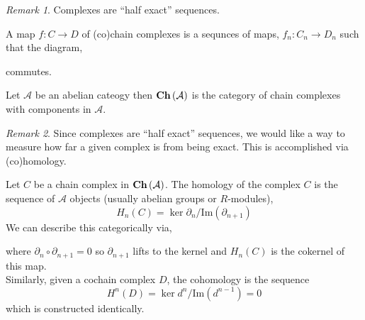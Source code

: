 \documentclass[12pt]{article}
\renewcommand{\Im}[1]{\mathrm{Im}(#1)}
\newcommand{\A}{\mathcal{A}}
\theoremstyle{remark}
\newtheorem*{remark}{Remark}
\theoremstyle{definition}
\newenvironment{definition}[1][Definition:]{\begin{trivlist}
\item[\hskip \labelsep {\bfseries #1}]}{\end{trivlist}}
\begin{document}
\begin{remark}
Complexes are ``half exact'' sequences. 
\end{remark}

\begin{definition}
A map $f : C \to D$ of (co)chain complexes is a sequnces of maps, $f_n : C_n \to D_n$ such that the diagram,
\begin{center}
\end{center}
commutes.
\end{definition}

\begin{definition}
Let $\A$ be an abelian cateogy then $\Ch{\A}$ is the category of chain complexes with components in $\A$. 
\end{definition}

\begin{remark}
Since complexes are ``half exact'' sequences, we would like a way to measure how far a given complex is from being exact. This is accomplished via (co)homology. 
\end{remark}

\begin{definition}
Let $C$ be a chain complex in $\Ch{\A}$. The homology of the complex $C$ is the sequence of $\A$ objects (usually abelian groups or $R$-modules),
\[ H_n(C) = \ker{\partial_n} / \Im{\partial_{n+1}} \]
We can describe this categorically via,
\begin{center}
\end{center}
where $\partial_{n} \circ \partial_{n+1} = 0$ so $\partial_{n+1}$ lifts to the kernel and $H_n(C)$ is the cokernel of this map. 
\bigskip\\
Similarly, given a cochain complex $D$, the cohomology is the sequence 
\[ H^n(D) = \ker{d^{n}} / \Im{d^{n-1}} = 0 \] 
which is constructed identically.
\end{definition}
\end{document}

